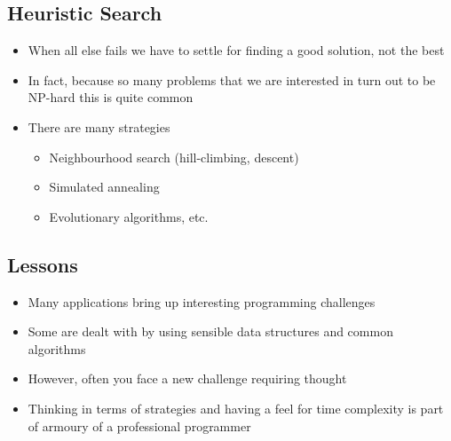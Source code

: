 
\begin{slide}
\section{Heuristic Search}

\begin{PauseHighLight}
  \begin{itemize}
  \item When all else fails we have to settle for finding a good
    solution, not the best\pause
  \item In fact, because so many problems that we are interested in turn
    out to be NP-hard this is quite common\pause
  \item There are many strategies
    \begin{itemize}\squeeze
    \item Neighbourhood search (hill-climbing, descent)
    \item Simulated annealing
    \item Evolutionary algorithms, etc.\pause
    \end{itemize}
  \end{itemize}
\end{PauseHighLight}

\end{slide}


\begin{slide}
\section{Lessons}

\begin{PauseHighLight}
  \begin{itemize}
  \item Many applications bring up interesting programming challenges\pause
  \item Some are dealt with by using sensible data structures and
    common algorithms\pause
  \item However, often you face a new challenge requiring thought\pause
  \item Thinking in terms of strategies and having a feel for time
    complexity is part of armoury of a professional programmer\pause
  \end{itemize}
\end{PauseHighLight}

\end{slide}
